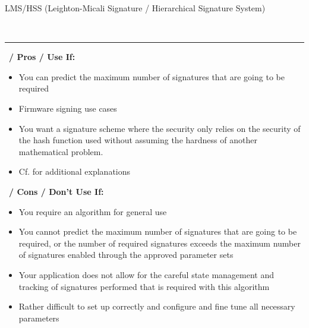 \begin{algorithmbox}{LMS/HSS (Leighton-Micali Signature / Hierarchical Signature System)}
\begin{minipage}[t]{0.64\textwidth}
    \end{minipage}\\
    \hrule
    \vspace{1\baselineskip}
    \begin{minipage}[t]{0.49\textwidth}
        \scriptsize\faThumbsUp\, {\bfseries / Pros / Use If:}
        \begin{itemize}[leftmargin=*]
            \setlength\itemsep{0em}
            \item You can predict the maximum number of signatures that are going to be required
            \item Firmware signing use cases
            \item You want a signature scheme where the security only relies on the security of the hash function used without assuming the hardness of another mathematical problem.
            \item Cf.  for additional explanations
        \end{itemize}
    \end{minipage}
    \hfill
    \begin{minipage}[t]{0.49\textwidth}
        \scriptsize \faThumbsDown\, {\bfseries / Cons / Don't Use If:}
        \begin{itemize}[leftmargin=*]
            \setlength\itemsep{0em}
            \item You require an algorithm for general use
            \item You cannot predict the maximum number of signatures that are going to be required, or the number of required signatures exceeds the maximum number of signatures enabled through the approved parameter sets
            \item Your application does not allow for the careful state management and tracking of signatures performed that is required with this algorithm
            \item Rather difficult to set up correctly and configure and fine tune all necessary parameters
        \end{itemize}
    \end{minipage}
\end{algorithmbox}
